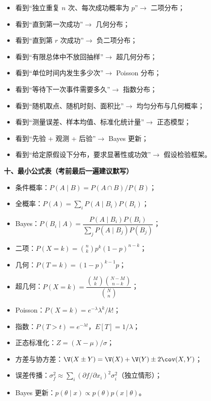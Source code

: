 \begin{itemize}[leftmargin=2em,itemsep=0.15em,topsep=0.15em]
  \item 看到“独立重复 $n$ 次、每次成功概率为 $p$”$\to$ 二项分布；
  \item 看到“直到第一次成功”$\to$ 几何分布；
  \item 看到“直到第 $r$ 次成功”$\to$ 负二项分布；
  \item 看到“有限总体中不放回抽样”$\to$ 超几何分布；
  \item 看到“单位时间内发生多少次”$\to$ Poisson 分布；
  \item 看到“等待下一次事件需要多久”$\to$ 指数分布；
  \item 看到“随机取点、随机时刻、面积比”$\to$ 均匀分布与几何概率；
  \item 看到“测量误差、样本均值、标准化统计量”$\to$ 正态模型；
  \item 看到“先验 + 观测 + 后验”$\to$ Bayes 更新；
  \item 看到“给定原假设下分布，要求显著性或功效”$\to$ 假设检验框架。
\end{itemize}

\textbf{十、最小公式表（考前最后一遍建议默写）}

\begin{itemize}[leftmargin=2em,itemsep=0.12em,topsep=0.12em]
  \item 条件概率：$P(A\mid B)=P(A\cap B)/P(B)$；
  \item 全概率：$P(A)=\sum_i P(A\mid B_i)P(B_i)$；
  \item Bayes：$P(B_i\mid A)=\dfrac{P(A\mid B_i)P(B_i)}{\sum_j P(A\mid B_j)P(B_j)}$；
  \item 二项：$P(X=k)=\binom{n}{k}p^k(1-p)^{n-k}$；
  \item 几何：$P(T=k)=(1-p)^{k-1}p$；
  \item 超几何：$P(X=k)=\dfrac{\binom{M}{k}\binom{N-M}{n-k}}{\binom{N}{n}}$；
  \item Poisson：$P(X=k)=e^{-\lambda}\lambda^k/k!$；
  \item 指数：$P(T>t)=e^{-\lambda t}$，$E[T]=1/\lambda$；
  \item 正态标准化：$Z=(X-\mu)/\sigma$；
  \item 方差与协方差：$\V(X\pm Y)=\V(X)+\V(Y)\pm 2\cov(X,Y)$；
  \item 误差传播：$\sigma_f^2\approx \sum_i(\partial f/\partial x_i)^2\sigma_i^2$（独立情形）；
  \item Bayes 更新：$p(\theta\mid x)\propto p(\theta)p(x\mid\theta)$。
\end{itemize}

